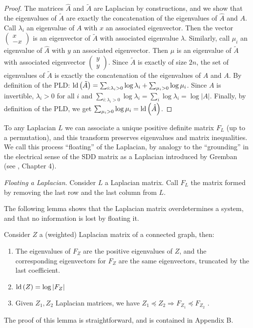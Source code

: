 \begin{proof}
The matrices $\hat{A}$ and $\tilde{A}$ are Laplacian by constructions,
and we show that the eigenvalues of $\tilde{A}$ are exactly the concatenation
of the eigenvalues of $\hat{A}$ and $A$. Call $\lambda_{i}$ an
eigenvalue of $A$ with $x$ an associated eigenvector. Then the vector
$\left(\begin{array}{c}
x\\
-x
\end{array}\right)$ is an eigenvector of $\tilde{A}$ with associated eigenvalue $\lambda$.
Similarly, call $\mu_{i}$ an eigenvalue of $\hat{A}$ with $y$ an
associated eigenvector. Then $\mu$ is an eigenvalue of $\tilde{A}$
with associated eigenvector $\left(\begin{array}{c}
y\\
y
\end{array}\right)$. Since $\tilde{A}$ is exactly of size $2n$, the set of eigenvalues
of $\tilde{A}$ is exactly the concatenation of the eigenvalues of
$\hat{A}$ and $A$. By definition of the PLD: $\text{\textnormal{ld}}\left(\tilde{A}\right)=\sum_{i:\lambda_{i}>0}\log\lambda_{i}+\sum_{\mu_{i}>0}\log\mu_{i}$.
Since $A$ is invertible, $\lambda_{i}>0$ for all $i$ and $\sum_{i:\lambda_{i}>0}\log\lambda_{i}=\sum_{i}\log\lambda_{i}=\log\left|A\right|$.
Finally, by definition of the PLD, we get $\sum_{\mu_{i}>0}\log\mu_{i}=\text{\textnormal{ld}}\left(\hat{A}\right)$.
\end{proof}
To any Laplacian $L$ we can associate a unique positive definite
matrix $F_{L}$ (up to a permutation), and this transform preserves
eigenvalues and matrix inequalities. We call this process ``floating''
of the Laplacian, by analogy to the ``grounding'' in the electrical
sense of the SDD matrix as a Laplacian introduced by Gremban (see
\cite{Gremban1996}, Chapter 4).
\begin{definition}
\emph{Floating a Laplacian}. Consider $L$ a Laplacian matrix. Call
$F_{L}$ the matrix formed by removing the last row and the last column
from $L$.
\end{definition}
The following lemma shows that the Laplacian matrix overdetermines
a system, and that no information is lost by floating it.
\begin{lemma}
\label{lem:floating-properties}Consider $Z$ a (weighted) Laplacian
matrix of a connected graph, then: 
\begin{enumerate}
\item The eigenvalues of $F_{Z}$ are the positive eigenvalues of $Z$,
and the corresponding eigenvectors for $F_{Z}$ are the same eigenvectors,
truncated by the last coefficient. 
\item $\text{\textnormal{ld}}\left(Z\right)=\log\left|F_{Z}\right|$ 
\item Given $Z_{1},Z_{2}$ Laplacian matrices, we have $Z_{1}\preceq Z_{2}\Rightarrow F_{Z_{1}}\preceq F_{Z_{2}}$
. 
\end{enumerate}
\end{lemma}
The proof of this lemma is straightforward, and is contained in Appendix
B.

